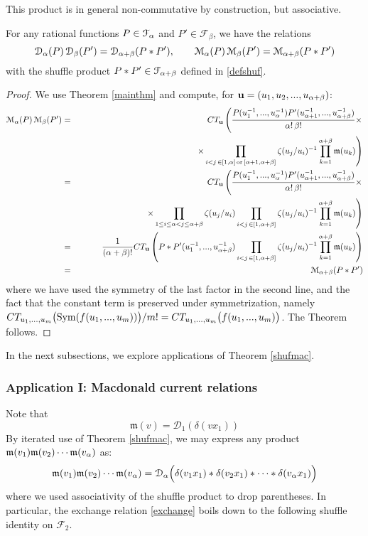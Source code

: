 This product is in general non-commutative by construction, but associative.

\begin{thm}\label{shufmac}
For any rational functions $P\in {\mathcal F}_{\alpha} $ and $P'\in {\mathcal F}_\beta$, we have the relations
\begin{equation}\label{prodshuf}
{\mathcal D}_{\alpha}(P)\, {\mathcal D}_\beta(P')={\mathcal D}_{{\alpha}+\beta}(P * P'), \qquad 
{\mathcal M}_{\alpha}(P)\, {\mathcal M}_\beta(P')={\mathcal M}_{{\alpha}+\beta}(P * P')
\end{equation}
with the shuffle product $P*P'\in {\mathcal F}_{{\alpha}+\beta}$ defined in \eqref{defshuf}.
\end{thm}
\begin{proof}
We use Theorem \ref{mainthm} and compute, for ${\mathbf u}=(u_1,u_2,...,u_{{\alpha}+\beta})$:
\begin{eqnarray*}
{\mathcal M}_{\alpha}(P)\, {\mathcal M}_\beta(P')&=&CT_{{\mathbf u}}\left( \frac{P(u_1^{-1},...,u_{\alpha}^{-1})P'(u_{{\alpha}+1}^{-1},...,u_{{\alpha}+\beta}^{-1})}{{\alpha}!\, \beta!}\times \right. \\
&&\qquad \qquad \qquad \qquad \left. \times \prod_{i<j\,  \in [1,{\alpha}]\,
{\rm or} \, [{\alpha}+1,{\alpha}+\beta] }\zeta(u_j/u_i)^{-1} \prod_{k=1}^{{\alpha}+\beta} {\mathfrak m}(u_k)\right) \\
&=&CT_{{\mathbf u}}\left(  \frac{P(u_1^{-1},...,u_{\alpha}^{-1})P'(u_{{\alpha}+1}^{-1},...,u_{{\alpha}+\beta}^{-1})}{{\alpha}!\, \beta!}\times \right. \\
&&\qquad \qquad \qquad \qquad \left. \times\prod_{1\leq i\leq {\alpha}<j\leq {\alpha}+\beta} \zeta(u_j/u_i)
\prod_{i<j \,\in [1,{\alpha}+\beta]}\zeta(u_j/u_i)^{-1}
\prod_{k=1}^{{\alpha}+\beta} {\mathfrak m}(u_k)\right)\\
&=& \frac{1}{({\alpha}+\beta)!}CT_{{\mathbf u}}\left( P*P'(u_1^{-1},...,u_{{\alpha}+\beta}^{-1})
\prod_{i<j \,\in [1,{\alpha}+\beta]}\zeta(u_j/u_i)^{-1}
\prod_{k=1}^{{\alpha}+\beta} {\mathfrak m}(u_k)\right)\\
&=&{\mathcal M}_{{\alpha}+\beta}(P*P')
\end{eqnarray*}
where we have used the symmetry of the last factor in the second line, and the fact that the 
constant term is preserved under symmetrization, namely 
$CT_{u_1,...,u_m}\big({\rm Sym}(f(u_1,...,u_{m}))\big)/m! =CT_{u_1,...,u_m}\big(f(u_1,...,u_{m})\big)$.
The Theorem follows.
\end{proof}

In the next subsections, we explore applications of Theorem \ref{shufmac}.

\subsubsection{Application I: Macdonald current relations}\label{appsecone}
Note that
$${\mathfrak m}(v)={\mathcal D}_1(\delta(v x_1))$$
By iterated use of Theorem \ref{shufmac},
we may express any product ${\mathfrak m}(v_1){\mathfrak m}(v_2)\cdots {\mathfrak m}(v_{\alpha})$ as:
$${\mathfrak m}(v_1){\mathfrak m}(v_2)\cdots {\mathfrak m}(v_{\alpha})={\mathcal D}_{\alpha}\Big(
\delta(v_1 x_1)*\delta(v_2 x_1)* \cdots *\delta(v_{\alpha} x_1)\Big)$$
where we used associativity of the shuffle product to drop parentheses.
In particular, the exchange relation \eqref{exchange} boils down to the following shuffle identity on ${\mathcal F}_2$.

